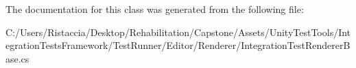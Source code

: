 The documentation for this class was generated from the following file\+:\begin{DoxyCompactItemize}
\item 
C\+:/\+Users/\+Ristaccia/\+Desktop/\+Rehabilitation/\+Capstone/\+Assets/\+Unity\+Test\+Tools/\+Integration\+Tests\+Framework/\+Test\+Runner/\+Editor/\+Renderer/Integration\+Test\+Renderer\+Base.\+cs\end{DoxyCompactItemize}

